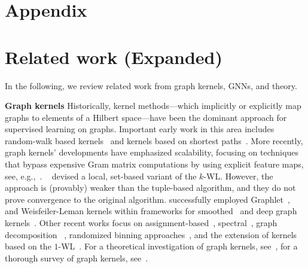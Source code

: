 \documentclass{article}
\newcommand{\xhdr}[1]{{\noindent\bfseries #1}}
\theoremstyle{definition}
\newcommand{\wl}{$1$-\textsf{WL}\xspace}
\newcommand{\kwl}{$k$-\textsf{WL}\xspace}
\begin{document}
\newpage
\appendix
\section*{Appendix}

\section{Related work (Expanded)}\label{exprel}

In the following, we review related work from graph kernels, GNNs, and theory.

\xhdr{Graph kernels}
Historically, kernel methods---which implicitly or explicitly map graphs to elements of a Hilbert space---have been the dominant approach for supervised learning on graphs. Important early work in this area includes random-walk based kernels~\cite{Gae+2003,Kas+2003,Kri+2017b} and kernels based on shortest paths~\cite{Bor+2005}. More recently, graph kernels' developments have emphasized scalability, focusing on techniques that bypass expensive Gram matrix computations by using explicit feature maps, see, e.g.,~\cite{She+2011}. \citeauthor{Mor+2017}~\cite{Mor+2017} devised a local, set-based variant of the \kwl. However, the approach is (provably) weaker than the tuple-based algorithm, and they do not prove convergence to the original algorithm. \citeauthor{Yan+2015} successfully employed Graphlet~\cite{She+2009}, and Weisfeiler-Leman kernels within frameworks for smoothed~\cite{Yan+2015} and deep graph kernels~\cite{Yan+2015a}. Other recent works focus on assignment-based~\cite{Joh+2015,Kri+2016,Nik+2017}, spectral~\cite{Kon+2016,Ver+2017}, graph decomposition ~\cite{Nik+2018}, randomized binning approaches~\cite{Hei+2019}, and the extension of kernels based on the \wl~\cite{Rie+2019,Tog+2019}. For a theoretical investigation of graph kernels, see~\cite{Kri+2018}, for a thorough survey of graph kernels, see~\cite{Kri+2019}. 
\end{document}
